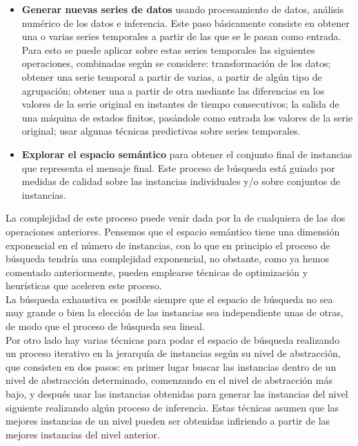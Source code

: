 \documentclass[10pt,a4paper]{article}
\begin{document}
\begin{itemize}
\item \textbf{Generar nuevas series de datos} usando procesamiento de datos, análisis numérico de los datos e inferencia. Este paso básicamente consiste en obtener una o varias series temporales a partir de las que se le pasan como entrada. Para esto se puede aplicar sobre estas series temporales las siguientes operaciones, combinadas según se considere: transformación de los datos; obtener una serie temporal a partir de varias, a partir de algún tipo de agrupación; obtener una a partir de otra mediante las diferencias en los valores de la serie original en instantes de tiempo consecutivos; la salida de una máquina de estados finitos, pasándole como entrada los valores de la serie original; usar algunas técnicas predictivas sobre series temporales.
\item \textbf{Explorar el espacio semántico} para obtener el conjunto final de instancias que representa el mensaje final. Este proceso de búsqueda está guiado por medidas de calidad sobre las instancias individuales y/o sobre conjuntos de instancias.
\end{itemize}

La complejidad de este proceso puede venir dada por la de cualquiera de las dos operaciones anteriores. Pensemos que el espacio semántico tiene una dimensión exponencial en el número de instancias, con lo que en principio el proceso de búsqueda tendría una complejidad exponencial, no obstante, como ya hemos comentado anteriormente, pueden emplearse técnicas de optimización y heurísticas que aceleren este proceso.\\

La búsqueda exhaustiva es posible siempre que el espacio de búsqueda no sea muy grande o bien la elección de las instancias sea independiente unas de otras, de modo que el proceso de búsqueda sea lineal.\\

Por otro lado hay varias técnicas para podar el espacio de búsqueda realizando un proceso iterativo en la jerarquía de instancias según su nivel de abstracción, que consisten en dos pasos: en primer lugar buscar las instancias dentro de un nivel de abstracción determinado, comenzando en el nivel de abstracción más bajo, y después usar las instancias obtenidas para generar las instancias del nivel siguiente realizando algún proceso de inferencia. Estas técnicas asumen que las mejores instancias de un nivel pueden ser obtenidas infiriendo a partir de las mejores instancias del nivel anterior.
\end{document}
